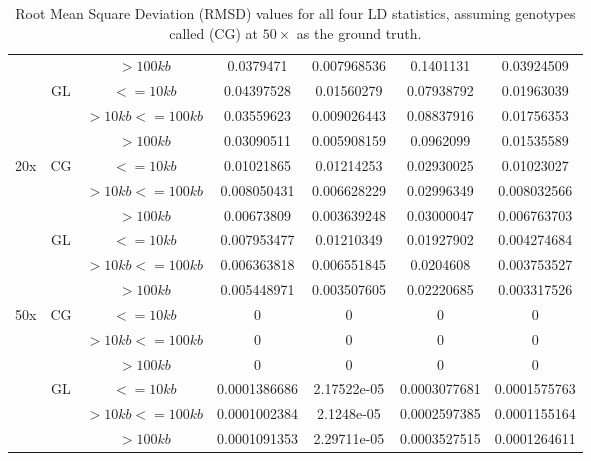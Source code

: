 \documentclass[a4paper]{article}
\begin{document}
\begin{table}[H]
\begin{tabular}{c|c|c|c|c|c|c}
& & $>100kb$ & 0.0379471 & 0.007968536 & 0.1401131 & 0.03924509 \\
\cline{2-7}
& \multirow{3}{*}{GL} & $<=10kb$ & 0.04397528 & 0.01560279 & 0.07938792 & 0.01963039 \\
& & $>10kb <=100kb$ & 0.03559623 & 0.009026443 & 0.08837916 & 0.01756353 \\
& & $>100kb$ & 0.03090511 & 0.005908159 & 0.0962099 & 0.01535589 \\
\hline
\multirow{6}{*}{20x} & \multirow{3}{*}{CG} & $<=10kb$ & 0.01021865 & 0.01214253 & 0.02930025 & 0.01023027 \\
& & $>10kb <=100kb$ & 0.008050431 & 0.006628229 & 0.02996349 & 0.008032566 \\
& & $>100kb$ & 0.00673809 & 0.003639248 & 0.03000047 & 0.006763703 \\
\cline{2-7}
& \multirow{3}{*}{GL} & $<=10kb$ & 0.007953477 & 0.01210349 & 0.01927902 & 0.004274684 \\
& & $>10kb <=100kb$ & 0.006363818 & 0.006551845 & 0.0204608 & 0.003753527 \\
& & $>100kb$ & 0.005448971 & 0.003507605 & 0.02220685 & 0.003317526 \\
\hline
\multirow{6}{*}{50x} & \multirow{3}{*}{CG} & $<=10kb$ & 0 & 0 & 0 & 0 \\
& & $>10kb <=100kb$ & 0 & 0 & 0 & 0 \\
& & $>100kb$ & 0 & 0 & 0 & 0 \\
\cline{2-7}
& \multirow{3}{*}{GL} & $<=10kb$ & 0.0001386686 & 2.17522e-05 & 0.0003077681 & 0.0001575763 \\
& & $>10kb <=100kb$ & 0.0001002384 & 2.1248e-05 & 0.0002597385 & 0.0001155164 \\
& & $>100kb$ & 0.0001091353 & 2.29711e-05 & 0.0003527515 & 0.0001264611 \\
\hline
\end{tabular}
\caption{Root Mean Square Deviation (RMSD) values for all four LD statistics, assuming genotypes called (CG) at $50\times$ as the ground truth.}\label{STab:RMSD}
\end{table}
\end{document}
